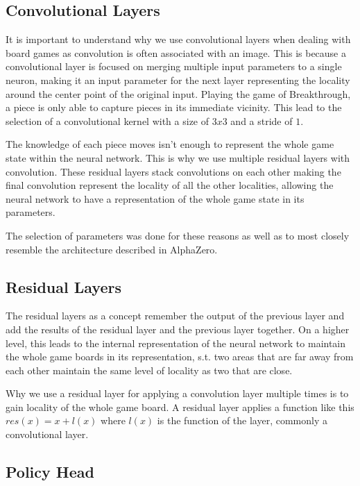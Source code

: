 \subsection{Convolutional Layers}

It is important to understand why we use convolutional layers when dealing with board games as convolution is often associated with an image. This is because a convolutional layer is focused on merging multiple input parameters to a single neuron, making it an input parameter for the next layer representing the locality around the center point of the original input. Playing the game of Breakthrough, a piece is only able to capture pieces in its immediate vicinity. This lead to the selection of a convolutional kernel with a size of $3x3$ and a stride of $1$.

The knowledge of each piece moves isn't enough to represent the whole game state within the neural network. This is why we use multiple residual layers with convolution. These residual layers stack convolutions on each other making the final convolution represent the locality of all the other localities, allowing the neural network to have a representation of the whole game state in its parameters.

The selection of parameters was done for these reasons as well as to most closely resemble the architecture described in AlphaZero.

\subsection{Residual Layers}

The residual layers as a concept remember the output of the previous layer and add the results of the residual layer and the previous layer together. On a higher level, this leads to the internal representation of the neural network to maintain the whole game boards in its representation, s.t. two areas that are far away from each other maintain the same level of locality as two that are close.

Why we use a residual layer for applying a convolution layer multiple times is to gain locality of the whole game board. A residual layer applies a function like this $res(x) = x + l(x)$ where $l(x)$ is the function of the layer, commonly a convolutional layer.

\subsection{Policy Head}

